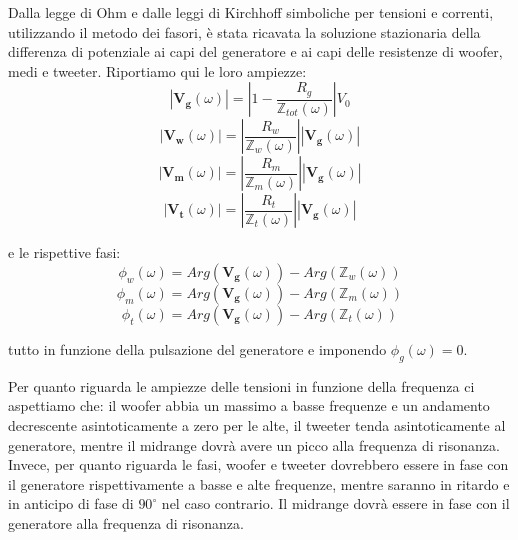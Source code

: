 \documentclass[12pt,italian]{article}
\begin{document}
Dalla legge di Ohm e dalle leggi di Kirchhoff simboliche per tensioni e
correnti, utilizzando il metodo dei fasori, è stata ricavata la soluzione
stazionaria della differenza di potenziale ai capi del generatore e ai capi
delle resistenze di woofer, medi e tweeter. Riportiamo qui le loro ampiezze:
\begin{equation}
	\left| \mathbf{V_{g}}(\omega) \right| = \left| 1 - \frac{R_g}
	{\mathbb{Z}_{tot}(\omega)}\right| V_{0}
	\label{eq:Vg}
\end{equation}
\begin{equation}
	\left| \mathbf{V_{w}}(\omega) \right| = \left| \frac{R_{w}}
	{\mathbb{Z}_{w}(\omega)}\right|\left| \mathbf{V_{g}}(\omega) \right|
	\label{eq:Vw}
\end{equation}
\begin{equation}
	\left| \mathbf{V_{m}}(\omega) \right| = \left| \frac{R_{m}}
	{\mathbb{Z}_{m}(\omega)}\right|\left| \mathbf{V_{g}}(\omega) \right|
	\label{eq:Vm}
\end{equation}
\begin{equation}
	\left| \mathbf{V_{t}}(\omega) \right| = \left| \frac{R_{t}}
	{\mathbb{Z}_{t}(\omega)}\right|\left| \mathbf{V_{g}}(\omega) \right|
	\label{eq:Vt}
\end{equation}

\noindent
e le rispettive fasi:
\begin{equation*}
	\phi_{w}(\omega) = Arg(\mathbf{V_{g}}(\omega)) - Arg(\mathbb{Z}_{w}(\omega))
\end{equation*}
\begin{equation*}
	\phi_{m}(\omega) = Arg(\mathbf{V_{g}}(\omega)) - Arg(\mathbb{Z}_{m}(\omega))
\end{equation*}
\begin{equation*}
	\phi_{t}(\omega) =  Arg(\mathbf{V_{g}}(\omega)) - Arg(\mathbb{Z}_{t}(\omega))
\end{equation*}

\noindent
tutto in funzione della pulsazione del generatore e imponendo $\phi_g (\omega) = 0$.

Per quanto riguarda le ampiezze delle tensioni in funzione della frequenza ci
aspettiamo che: il woofer abbia un massimo a basse frequenze e un andamento
decrescente asintoticamente a zero per le alte, il tweeter tenda
asintoticamente al generatore, mentre il midrange dovrà avere un picco alla
frequenza di risonanza. Invece, per quanto riguarda le fasi, woofer e tweeter
dovrebbero essere in fase con il generatore rispettivamente a basse e alte
frequenze, mentre saranno in ritardo e in anticipo di fase di $90^\circ$ nel
caso contrario. Il midrange dovrà essere in fase con il generatore alla
frequenza di risonanza.
\end{document}
